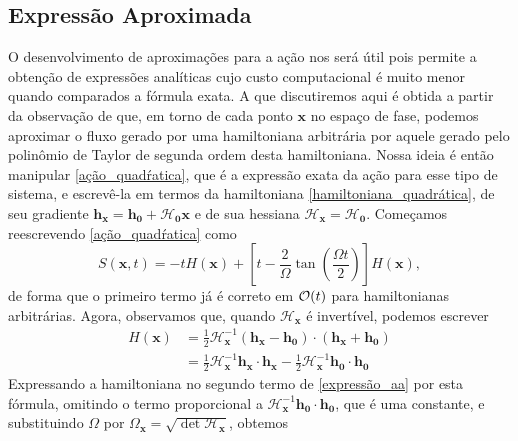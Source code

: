 \documentclass[
	12pt,
	oneside,			%
	a4paper,			%
	english,			%
	brazil				%
	]{abntex2}
\theoremstyle{definition}
\begin{document}
\subsection{Expressão Aproximada}
\label{Expressões Aproximadas}

O desenvolvimento de aproximações para a ação nos será útil pois permite a obtenção de expressões analíticas cujo custo computacional é muito menor quando comparados a fórmula exata. A que discutiremos aqui é obtida a partir da observação de que, em torno de cada ponto $\mathbf{x}$ no espaço de fase, podemos aproximar o fluxo gerado por uma hamiltoniana arbitrária por aquele gerado pelo polinômio de Taylor de segunda ordem desta hamiltoniana. Nossa ideia é então manipular \eqref{ação_quadŕatica}, que é a expressão exata da ação para esse tipo de sistema, e escrevê-la em termos da hamiltoniana \eqref{hamiltoniana_quadrática}, de seu gradiente $\mathbf{h}_\mathbf{x} = \mathbf{h}_{\mathbf{0}} + \boldsymbol{\mathcal{H}}_{\mathbf{0}} \mathbf{x}$ e de sua hessiana $\boldsymbol{\mathcal{H}}_\mathbf{x} = \boldsymbol{\mathcal{H}}_{\mathbf{0}}$. Começamos reescrevendo \eqref{ação_quadŕatica} como
\begin{equation}
\label{expressão_aa}
    S(\mathbf{x},t) = -t H(\mathbf{x}) +  \left[t-\frac{2}{\Omega}\tan \left(\frac{\Omega t}{2}\right)\right] H(\mathbf{x}),
\end{equation}
de forma que o primeiro termo já é correto em $\order{t}$ para hamiltonianas arbitrárias. Agora, observamos que, quando $\boldsymbol{\mathcal{H}}_\mathbf{x}$ é invertível, podemos escrever
\begin{equation}
        \begin{aligned}
        H(\mathbf{x}) &= \frac{1}{2} \boldsymbol{\mathcal{H}}_\mathbf{x}^{-1}\left(\mathbf{h}_\mathbf{x}-\mathbf{h}_{\mathbf{0}}\right) \cdot \left(\mathbf{h}_\mathbf{x} + \mathbf{h}_{\mathbf{0}}\right) \\
        &= \frac{1}{2} \boldsymbol{\mathcal{H}}_\mathbf{x}^{-1}\mathbf{h}_\mathbf{x} \cdot \mathbf{h}_\mathbf{x}  - \frac{1}{2} \boldsymbol{\mathcal{H}}_\mathbf{x}^{-1}\mathbf{h}_\mathbf{0} \cdot \mathbf{h}_\mathbf{0}
    \end{aligned}
\end{equation}
Expressando a hamiltoniana no segundo termo de \eqref{expressão_aa} por esta fórmula, omitindo o termo proporcional a $\boldsymbol{\mathcal{H}}_\mathbf{x}^{-1}\mathbf{h}_\mathbf{0} \cdot \mathbf{h}_\mathbf{0}$, que é uma constante, e substituindo $\Omega$ por $\Omega_\mathbf{x} = \sqrt{\det \boldsymbol{\mathcal{H}}_\mathbf{x}}$, obtemos
\end{document}
